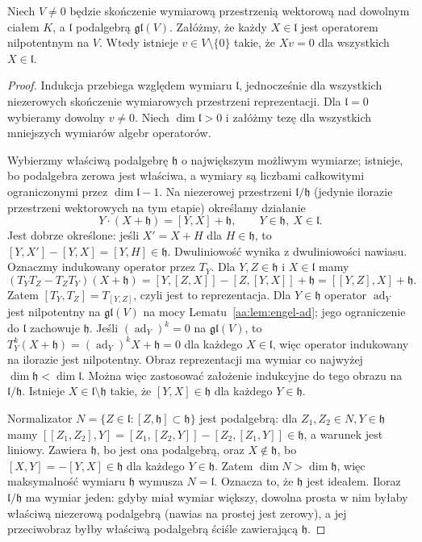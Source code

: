\begin{twierdzenie}
\label{aa:tw:engel-linear}
Niech $V\ne0$ będzie skończenie wymiarową przestrzenią
wektorową nad dowolnym ciałem $K$, a $\mathfrak l$
podalgebrą $\mathfrak{gl}(V)$. Załóżmy, że każdy
$X\in\mathfrak l$ jest operatorem nilpotentnym na $V$.
Wtedy istnieje $v\in V\setminus\{0\}$ takie, że
$Xv=0$ dla wszystkich $X\in\mathfrak l$.
\end{twierdzenie}
\begin{proof}
Indukcja przebiega względem wymiaru $\mathfrak l$,
jednocześnie dla wszystkich niezerowych skończenie
wymiarowych przestrzeni reprezentacji.
Dla $\mathfrak l=0$ wybieramy dowolny $v\ne0$.
Niech $\dim\mathfrak l>0$ i załóżmy tezę dla
wszystkich mniejszych wymiarów algebr operatorów.

Wybierzmy właściwą podalgebrę $\mathfrak h$ o największym
możliwym wymiarze; istnieje, bo podalgebra zerowa
jest właściwa, a wymiary są liczbami całkowitymi
ograniczonymi przez $\dim\mathfrak l-1$.
Na niezerowej przestrzeni $\mathfrak l/\mathfrak h$
(jedynie ilorazie przestrzeni wektorowych na tym etapie)
określamy działanie
\[
 Y\cdot(X+\mathfrak h)=[Y,X]+\mathfrak h,
 \qquad Y\in\mathfrak h,\ X\in\mathfrak l.
\]
Jest dobrze określone: jeśli $X'=X+H$ dla
$H\in\mathfrak h$, to $[Y,X']-[Y,X]=[Y,H]\in\mathfrak h$.
Dwuliniowość wynika z dwuliniowości nawiasu.
Oznaczmy indukowany operator przez $T_Y$. Dla
$Y,Z\in\mathfrak h$ i $X\in\mathfrak l$ mamy
\[
 (T_YT_Z-T_ZT_Y)(X+\mathfrak h)
 = [Y,[Z,X]]-[Z,[Y,X]]+\mathfrak h
 = [[Y,Z],X]+\mathfrak h.
\]
Zatem $[T_Y,T_Z]=T_{[Y,Z]}$, czyli jest to reprezentacja. Dla $Y\in\mathfrak h$
operator $\operatorname{ad}_Y$ jest nilpotentny
na $\mathfrak{gl}(V)$ na mocy
Lematu~\ref{aa:lem:engel-ad}; jego ograniczenie
do $\mathfrak l$ zachowuje $\mathfrak h$.
Jeśli $(\operatorname{ad}_Y)^k=0$ na $\mathfrak{gl}(V)$,
to $T_Y^k(X+\mathfrak h)=(\operatorname{ad}_Y)^kX+
\mathfrak h=0$ dla każdego $X\in\mathfrak l$,
więc operator indukowany na ilorazie jest nilpotentny.
Obraz reprezentacji ma wymiar co najwyżej
$\dim\mathfrak h<\dim\mathfrak l$.
Można więc zastosować założenie indukcyjne
do tego obrazu na $\mathfrak l/\mathfrak h$.
Istnieje $X\in\mathfrak l\setminus\mathfrak h$
takie, że $[Y,X]\in\mathfrak h$ dla każdego
$Y\in\mathfrak h$.

Normalizator $N=\{Z\in\mathfrak l:[Z,\mathfrak h]
\subset\mathfrak h\}$ jest podalgebrą:
dla $Z_1,Z_2\in N,Y\in\mathfrak h$ mamy
$[[Z_1,Z_2],Y]=[Z_1,[Z_2,Y]]-[Z_2,[Z_1,Y]]
\in\mathfrak h$, a warunek jest liniowy.
Zawiera $\mathfrak h$, bo jest ona podalgebrą,
oraz $X\notin\mathfrak h$, bo $[X,Y]=-[Y,X]\in\mathfrak h$
dla każdego $Y\in\mathfrak h$.
Zatem $\dim N>\dim\mathfrak h$, więc maksymalność
wymiaru $\mathfrak h$ wymusza
$N=\mathfrak l$. Oznacza to, że $\mathfrak h$
jest ideałem. Iloraz $\mathfrak l/\mathfrak h$
ma wymiar jeden: gdyby miał wymiar większy,
dowolna prosta w nim byłaby właściwą niezerową
podalgebrą (nawias na prostej jest zerowy),
a jej przeciwobraz byłby właściwą podalgebrą
ściśle zawierającą $\mathfrak h$.


\end{proof}

